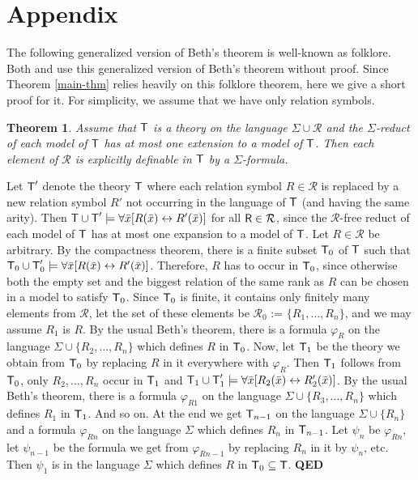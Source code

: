 \documentclass[12pt,leqno]{article}
\newcommand{\de}{\mbox{\ :=\ }}
\newcommand{\T}{\mbox{\sf T}}
\newcommand{\R}{\mbox{\sf R}}
\newcommand{\RR}{\mathcal{R}}
\newcommand{\qed}{\hfill\mbox{\bf QED}\bigskip}
\newtheorem{thm}{Theorem}
\begin{document}
\appendix
\section{Appendix}

The following generalized version of Beth's theorem is well-known as
folklore. Both \cite{vBP} and \cite{Makkai87} use this generalized version of Beth's theorem without proof.  Since Theorem \ref{main-thm} relies heavily on this folklore theorem, here we give a short proof for it. For simplicity, we assume that we have only relation symbols.


\begin{thm}\label{genBeth-thm} Assume that $\T$ is a theory on the language $\Sigma\cup\RR$ and the $\Sigma$-reduct of each model of $\T$ has at most one extension to a model of $\T$. Then each element of $\RR$ is explicitly definable in $\T$ by a $\Sigma$-formula.
\end{thm}

Let $\T'$ denote the theory $\T$ where each relation symbol $R\in\RR$ is replaced by a new relation symbol $R'$ not occurring in the language of $\T$ (and having the same arity). Then $\T\cup\T'\models \forall\bar{x}[R(\bar{x})\leftrightarrow R'(\bar{x})]$ for all $\R\in\RR$, since the $\RR$-free reduct of each model of $\T$ has at most one expansion to a model of $\T$. Let $R\in\RR$ be arbitrary. By the compactness theorem, there is a finite subset $\T_0$ of $\T$ such that $\T_0\cup\T_0'\models \forall\bar{x}[R(\bar{x})\leftrightarrow R'(\bar{x})]$.  Therefore, $R$ has to occur in $\T_0$, since otherwise both the empty set and the biggest relation of the same rank as $R$ can be chosen in a model to satisfy $\T_0$.  Since $\T_0$ is finite, it contains only finitely many elements from $\RR$, let the set of these elements be $\RR_0\de\{ R_1,\dots,R_n\}$, and we may assume $R_1$ is $R$. By the usual Beth's theorem, there is a formula $\varphi_R$ on the language $\Sigma\cup\{ R_2,\dots, R_n\}$ which defines $R$ in $\T_0$.  Now, let $\T_1$ be the theory we obtain from $\T_0$ by replacing $R$ in it everywhere with $\varphi_R$. Then $\T_1$ follows from $\T_0$, only $R_2,\dots, R_n$ occur in $\T_1$ and $\T_1\cup\T_1'\models \forall\bar{x}[R_2(\bar{x})\leftrightarrow R_2'(\bar{x})]$. By the usual Beth's theorem, there is a formula $\varphi_{R1}$ on the language $\Sigma\cup\{ R_3,\dots, R_n\}$ which defines $R_1$ in $\T_1$. And so on. At the end we get $\T_{n-1}$ on the language $\Sigma\cup\{ R_n\}$ and a formula $\varphi_{Rn}$ on the language $\Sigma$ which defines $R_n$ in $\T_{n-1}$. Let $\psi_n$ be $\varphi_{Rn}$, let $\psi_{n-1}$ be the formula we get from $\varphi_{Rn-1}$ by replacing $R_n$ in it by $\psi_n$, etc. Then $\psi_1$ is in the language $\Sigma$ which defines $R$ in $\T_0\subseteq \T$. %
\qed\bigskip
\end{document}
